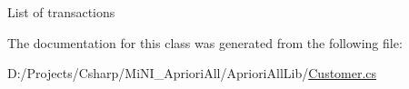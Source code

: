 List of transactions 



The documentation for this class was generated from the following file\-:\begin{DoxyCompactItemize}
\item 
D\-:/\-Projects/\-Csharp/\-Mi\-N\-I\-\_\-\-Apriori\-All/\-Apriori\-All\-Lib/\hyperlink{_customer_8cs}{Customer.\-cs}\end{DoxyCompactItemize}
